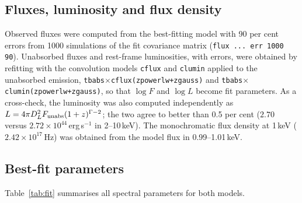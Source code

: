 \documentclass[11pt,a4paper]{article}
\begin{document}
\subsection{Fluxes, luminosity and flux density}

Observed fluxes were computed from the best-fitting model with 90 per cent errors from 1000 simulations of the fit covariance matrix (\texttt{flux ... err 1000 90}). Unabsorbed fluxes and rest-frame luminosities, with errors, were obtained by refitting with the convolution models \texttt{cflux} and \texttt{clumin} applied to the unabsorbed emission, \texttt{tbabs$\times$cflux(zpowerlw+zgauss)} and \texttt{tbabs$\times$clumin(zpowerlw+zgauss)}, so that $\log F$ and $\log L$ become fit parameters. As a cross-check, the luminosity was also computed independently as $L=4\pi D_L^2 F_{\rm unabs}(1+z)^{\Gamma-2}$; the two agree to better than 0.5 per cent ($2.70$ versus $2.72\times10^{44}$\,erg\,s$^{-1}$ in 2--10\,keV). The monochromatic flux density at 1\,keV ($2.42\times10^{17}$\,Hz) was obtained from the model flux in 0.99--1.01\,keV.

\subsection{Best-fit parameters}

Table~\ref{tab:fit} summarises all spectral parameters for both models.
\end{document}
